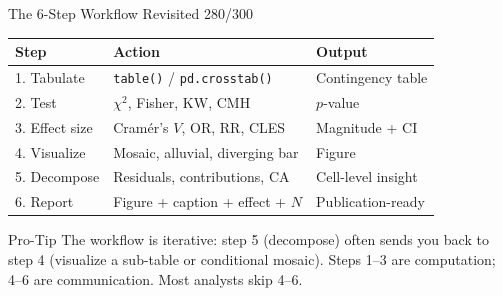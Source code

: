 \documentclass[10pt]{beamer}
\newcommand{\smark}[1]{\hfill{\scriptsize\color{codegray}#1}}
\begin{document}
\begin{frame}{The 6-Step Workflow Revisited}
\smark{280/300}
\centering\small
\begin{tabular}{@{}lll@{}}
    \toprule
    \textbf{Step} & \textbf{Action} & \textbf{Output} \\
    \midrule
    1. Tabulate       & \texttt{table()} / \texttt{pd.crosstab()}  & Contingency table \\
    2. Test           & $\chi^2$, Fisher, KW, CMH                 & $p$-value \\
    3. Effect size    & Cram\'er's $V$, OR, RR, CLES              & Magnitude + CI \\
    4. Visualize      & Mosaic, alluvial, diverging bar            & Figure \\
    5. Decompose      & Residuals, contributions, CA               & Cell-level insight \\
    6. Report         & Figure + caption + effect + $N$            & Publication-ready \\
    \bottomrule
\end{tabular}

\vspace{0.3cm}
\begin{alertblock}{Pro-Tip}
    \scriptsize The workflow is iterative: step 5 (decompose) often sends you back to step 4 (visualize a sub-table or conditional mosaic). Steps 1--3 are computation; 4--6 are communication. Most analysts skip 4--6.
\end{alertblock}
\end{frame}
\end{document}
